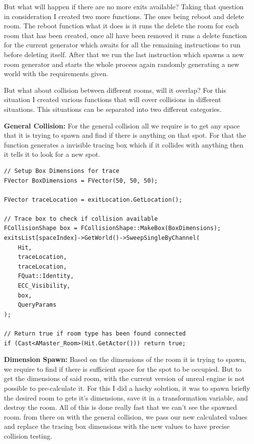 \documentclass[10pt, letterpaper]{article}
\begin{document}
\begin{Form}
	But what will happen if there are no more exits available? Taking that question in consideration I created two more
	functions. The ones being reboot and delete room. The reboot function what it does is it runs the delete the room for
	each room that has been created, once all have been removed it runs a delete function for the current generator which
	awaits for all the remaining instructions to run before deleting itself. After that we run the last instruction which
	spawns a new room generator and starts the whole process again randomly generating a new world with the requirements
	given.

	But what about collision between different rooms, will it overlap? For this situation I created various functions
	that will cover collisions in different situations. This situations can be separated into two different categories.

	\textbf{General Collision:} For the general collision all we require is to get any space that it is trying to spawn and
	find if there is anything on that spot. For that the function generates a invisible tracing box which if it collides
	with anything then it tells it to look for a new spot.

	\begin{framed}
		\begin{verbatim}
// Setup Box Dimensions for trace
FVector BoxDimensions = FVector(50, 50, 50);

FVector traceLocation = exitLocation.GetLocation();

// Trace box to check if collision available
FCollisionShape box = FCollisionShape::MakeBox(BoxDimensions);
exitsList[spaceIndex]->GetWorld()->SweepSingleByChannel(
    Hit,
    traceLocation,
    traceLocation,
    FQuat::Identity,
    ECC_Visibility,
    box,
    QueryParams
);

// Return true if room type has been found connected
if (Cast<AMaster_Room>(Hit.GetActor())) return true;
        \end{verbatim}
	\end{framed}

	\textbf{Dimension Spawn:} Based on the dimensions of the room it is trying to spawn, we require to find if there is
	sufficient space for the spot to be occupied. But to get the dimensions of said room, with the current version of
	unreal engine is not possible to pre-calculate it. For this I did a hacky solution, it was to spawn briefly the
	desired room to gets it's dimensions, save it in a transformation variable, and destroy the room. All of this is done
	really fast that we can't see the spawned room. from there on with the general collision, we pass our new calculated
	values and replace the tracing box dimensions with the new values to have precise collision testing.


\end{Form}
\end{document}
